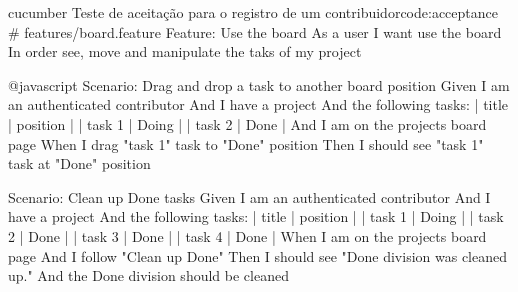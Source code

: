 \begin{mycode}{cucumber}%
{Teste de aceitação para o registro de um contribuidor}{code:acceptance}
# features/board.feature
Feature: Use the board
  As a user
  I want use the board
  In order see, move and manipulate the taks of my project

  @javascript
  Scenario: Drag and drop a task to another board position
    Given I am an authenticated contributor
    And I have a project
    And the following tasks:
      | title  | position |
      | task 1 | Doing    |
      | task 2 | Done     |
    And I am on the projects board page
    When I drag "task 1" task to "Done" position
    Then I should see "task 1" task at "Done" position

  Scenario: Clean up Done tasks
    Given I am an authenticated contributor
    And I have a project
    And the following tasks:
      | title  | position |
      | task 1 | Doing    |
      | task 2 | Done     |
      | task 3 | Done     |
      | task 4 | Done     |
    When I am on the projects board page
    And I follow "Clean up Done"
    Then I should see "Done division was cleaned up."
    And the Done division should be cleaned
\end{mycode}


